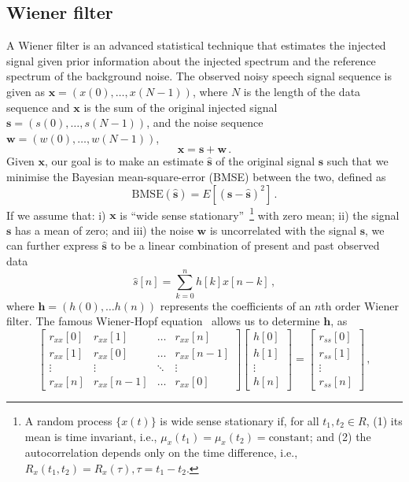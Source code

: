\documentclass[aps,pra,superscriptaddress,reprint,nofootinbib]{revtex4-1}
\begin{document}
\subsection{Wiener filter}
\label{sec:Wiener}

A Wiener filter is an advanced statistical technique that estimates the injected signal given prior information about the injected spectrum and the reference spectrum of the background noise. 
The observed noisy speech signal sequence is given as $\mathbf{x}=(x(0),\dots, x(N-1))$, where $N$ is the length of the data sequence and $\mathbf{x}$ is the sum of the original injected signal $\mathbf{s}=(s(0),\dots,s(N-1))$, and the noise sequence $\mathbf{w}=(w(0),\dots,w(N-1))$, 
\begin{equation}
    \mathbf{x}=\mathbf{s}+\mathbf{w}\,.
\end{equation}
Given $\textbf{x}$, our goal is to make an estimate $\hat{\textbf{s}}$ of the original signal $\textbf{s}$ such that we minimise the Bayesian mean-square-error (BMSE) between the two, defined as 
\begin{equation}
\label{eq:BMSE}
\text{BMSE}(\hat{\textbf{s}})=E[(\textbf{s}-\hat{\textbf{s}})^2]\,.
\end{equation}
If we assume that: i) $\textbf{x}$ is ``wide sense stationary''~\footnote{ A random process $\{x(t)\}$ is wide sense stationary if, for all $t_1,t_2 \in R$, (1) its mean is time invariant, i.e., $\mu_x(t_1)=\mu_x(t_2)=\text{constant}$; and (2) the autocorrelation depends only on the time difference, i.e., $R_x(t_1,t_2)=R_x(\tau),\tau=t_1-t_2$.} with zero mean; ii) the signal $\textbf{s}$ has a mean of zero; and iii) the noise $\textbf{w}$ is uncorrelated with the signal $\textbf{s}$, we can further express $\hat{\textbf{s}}$ to be a linear combination of present and past observed data
\begin{equation}
\hat{{s}}[n]=\sum_{k=0}^{n}h[k]x[n-k]\,,
\end{equation}
where $\textbf{h}=(h(0),\dots h(n))$ represents the coefficients of an $n$th order Wiener filter.
The famous Wiener-Hopf equation~\citep{noble1959methods} allows us to determine $\textbf{h}$, as\begin{equation}
\label{eqn:wiener-hopf}
\begin{bmatrix}  
r_{xx}[0]&r_{xx}[1]&\dots& r_{xx}[n]\\
r_{xx}[1]&r_{xx}[0]&\dots &r_{xx}[n-1]\\
\vdots&\vdots&\ddots&\vdots\\
r_{xx}[n]&r_{xx}[n-1]&\dots &r_{xx}[0]
\end{bmatrix}
\begin{bmatrix}
h[0]\\
h[1]\\
\vdots\\
h[n]
\end{bmatrix}=
\begin{bmatrix}
r_{ss}[0]\\
r_{ss}[1]\\
\vdots\\
r_{ss}[n]
\end{bmatrix}\,,
\end{equation}
\end{document}
